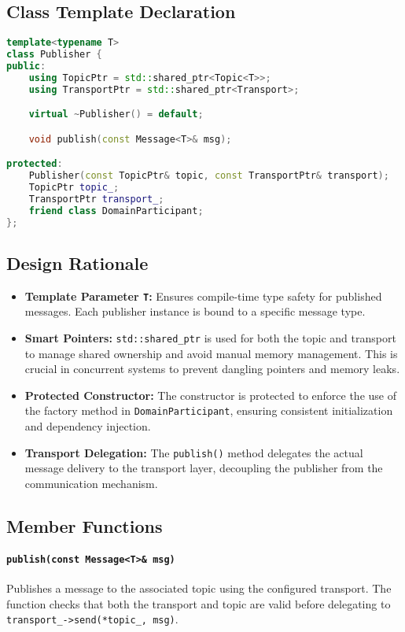 \documentclass[12pt]{report}
\begin{document}
\subsection{Class Template Declaration}
\begin{lstlisting}[language=C++]
template<typename T>
class Publisher {
public:
    using TopicPtr = std::shared_ptr<Topic<T>>;
    using TransportPtr = std::shared_ptr<Transport>;

    virtual ~Publisher() = default;

    void publish(const Message<T>& msg);

protected:
    Publisher(const TopicPtr& topic, const TransportPtr& transport);
    TopicPtr topic_;
    TransportPtr transport_;
    friend class DomainParticipant;
};
\end{lstlisting}

\subsection{Design Rationale}
\begin{itemize}
    \item \textbf{Template Parameter \texttt{T}:} Ensures compile-time type safety for published messages. Each publisher instance is bound to a specific message type.
    \item \textbf{Smart Pointers:} \texttt{std::shared\_ptr} is used for both the topic and transport to manage shared ownership and avoid manual memory management. This is crucial in concurrent systems to prevent dangling pointers and memory leaks.
    \item \textbf{Protected Constructor:} The constructor is protected to enforce the use of the factory method in \texttt{DomainParticipant}, ensuring consistent initialization and dependency injection.
    \item \textbf{Transport Delegation:} The \texttt{publish()} method delegates the actual message delivery to the transport layer, decoupling the publisher from the communication mechanism.
\end{itemize}

\subsection{Member Functions}
\paragraph{\texttt{publish(const Message<T>\& msg)}}
Publishes a message to the associated topic using the configured transport. The function checks that both the transport and topic are valid before delegating to \texttt{transport\_->send(*topic\_, msg)}.
\end{document}
